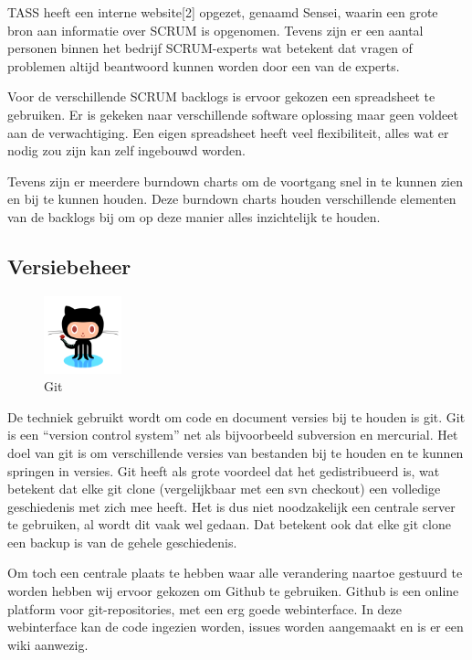 \documentclass[]{article}
\begin{document}
TASS heeft een interne website[2] opgezet, genaamd Sensei, waarin
een grote bron aan informatie over SCRUM is opgenomen. Tevens zijn er een
aantal personen binnen het bedrijf SCRUM-experts wat betekent dat vragen of
problemen altijd beantwoord kunnen worden door een van de experts.

Voor de verschillende SCRUM backlogs is ervoor gekozen een spreadsheet te
gebruiken. Er is gekeken naar verschillende software oplossing maar geen
voldeet aan de verwachtiging. Een eigen spreadsheet heeft veel
flexibiliteit, alles wat er nodig zou zijn kan zelf ingebouwd worden.

Tevens zijn er meerdere burndown charts om de voortgang snel in te kunnen
zien en bij te kunnen houden. Deze burndown charts houden verschillende
elementen van de backlogs bij om op deze manier alles inzichtelijk te
houden.

\newpage
\subsection{Versiebeheer}

\begin{figure}
  \begin{center}
    \includegraphics[width=0.20\textwidth]{git.pdf}
  \end{center}
  \caption{Git}
\end{figure}
De techniek gebruikt wordt om code en document versies bij te houden is
git. Git is een “version control system” net als bijvoorbeeld subversion en
mercurial. Het doel van git is om verschillende versies van bestanden bij
te houden en te kunnen springen in versies. Git heeft als grote voordeel
dat het gedistribueerd is, wat betekent dat elke git clone (vergelijkbaar
met een svn checkout) een volledige geschiedenis met zich mee heeft. Het is
dus niet noodzakelijk een centrale server te gebruiken, al wordt dit vaak
wel gedaan. Dat betekent ook dat elke git clone een backup is van de gehele
geschiedenis.

Om toch een centrale plaats te hebben waar alle verandering naartoe
gestuurd te worden hebben wij ervoor gekozen om Github te gebruiken. Github
is een online platform voor git-repositories, met een erg goede
webinterface. In deze webinterface kan de code ingezien worden, issues
worden aangemaakt en is er een wiki aanwezig.
\end{document}

